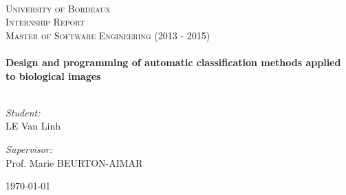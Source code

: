 \begin{titlepage}
\begin{center}
\\[1.5cm]
\textsc{\LARGE University of Bordeaux} \\[1.5cm]
\textsc{\Large Internship Report}\\[1cm]
\textsc{\Large Master of Software Engineering (2013 - 2015)}\\[0.5cm]
\HRule
\\[0.3cm]
\huge \bfseries Design and programming of automatic classification methods applied to biological images
\\[0.3cm]
\HRule
\\[1cm]
\noindent 
\begin{minipage}{0.4\textwidth}
\begin{flushleft} \large
\emph{Student:}\\
\textsc{LE} Van Linh 
\end{flushleft}
\end{minipage}%
\begin{minipage}{0.6\textwidth}
\begin{flushright} \large
\emph{Supervisor:} \\
Prof. Marie \textsc{BEURTON-AIMAR} \\
\end{flushright}
\end{minipage}

\vfill
{\large \today}
\end{center}
\end{titlepage}
